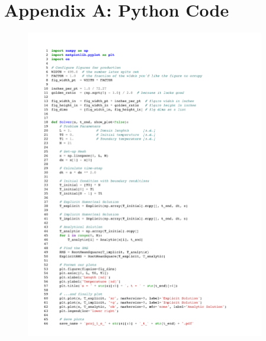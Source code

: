 \documentclass[twocolumn,10pt]{asme2ej}
\begin{document}
%

%

\clearpage
\onecolumn
\appendix       %
\section*{Appendix A: Python Code}

\begin{figure}[b]
\begin{center}
\includegraphics[page=1,width=0.93\textwidth]{../Karasinski - Case Study 1.pdf}
\end{center}
\end{figure}
\end{document}
